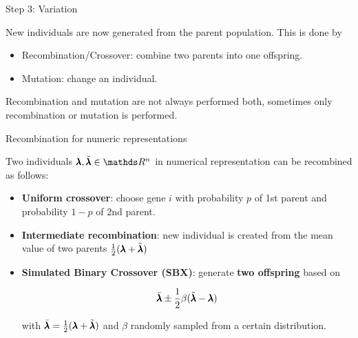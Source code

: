 \begin{frame}{Step 3: Variation}

New individuals are now generated from the parent population. This is done by

\begin{itemize}
\item Recombination/Crossover: combine two parents into one offspring.
\item Mutation: change an individual.
\end{itemize}

Recombination and mutation are not always performed both, sometimes only recombination or mutation is performed.

\end{frame}

\begin{frame}{Recombination for numeric representations}

Two individuals $\xx, \tilde\xx \in \R^n$ in numerical representation can be recombined as follows:

\begin{itemize}
\item \textbf{Uniform crossover}: choose gene $i$ with probability $p$ of 1st parent and probability $1-p$ of 2nd parent.
\item \textbf{Intermediate recombination}: new individual is created from the mean value of two parents $\frac{1}{2}(\pmb{\lambda} + \tilde{\pmb{\lambda}})$
\item \textbf{Simulated Binary Crossover (SBX)}: generate \textbf{two offspring} based on

$$
\bar{\pmb{\lambda}} \pm \frac{1}{2} \beta (\tilde{\pmb{\lambda}} - \pmb{\lambda})
$$

with $\bar{\pmb{\lambda}} = \frac{1}{2} (\pmb{\lambda} + \tilde{\pmb{\lambda}})$ and $\beta$ randomly sampled from a certain distribution.
\end{itemize}

\end{frame}

